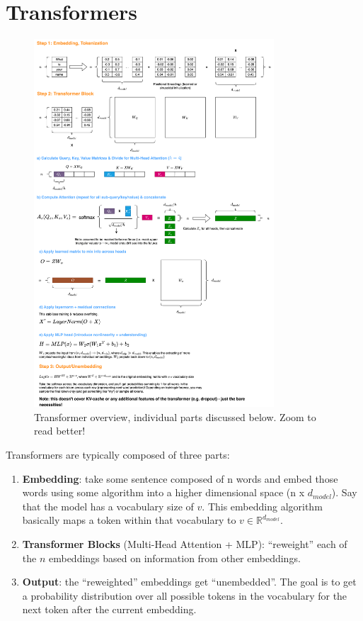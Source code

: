 \documentclass[12pt]{article}
\begin{document}
\newpage
\section{Transformers}

\begin{figure}[H]
    \centering
    \includegraphics[width=0.8\textwidth]{../media/transformer.png}
    \caption{Transformer overview, individual parts discussed below. Zoom to read better!}
    \label{fig:transformer}
\end{figure}

Transformers are typically composed of three parts:
\begin{enumerate}
  \item \textbf{Embedding}: take some sentence composed of n words and embed those words using some algorithm into a higher dimensional space (n x $d_{model}$). Say that the model has a vocabulary size of $v$. This embedding algorithm basically maps a token within that vocabulary to $v \in \mathbb{R}^{d_{model}}$.
  \item \textbf{Transformer Blocks} (Multi-Head Attention + MLP): \enquote{reweight} each of the $n$ embeddings based on information from other embeddings. 
  \item \textbf{Output}: the \enquote{reweighted} embeddings get \enquote{unembedded}. The goal is to get a probability distribution over all possible tokens in the vocabulary for the next token after the current embedding.
\end{enumerate}
\end{document}
